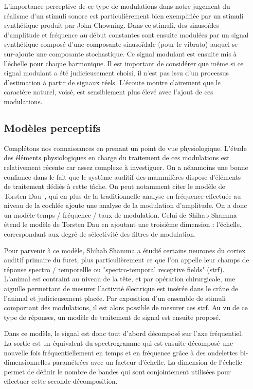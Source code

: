L'importance perceptive de ce type de modulations dans notre jugement du réalisme d'un stimuli sonore est particulièrement bien exemplifiée par un stimuli synthétique produit par John Chowning. Dans ce stimuli, des sinusoïdes d'amplitude et fréquence au début constantes sont ensuite modulées par un signal synthétique composé d'une composante sinusoïdale (pour le vibrato) auquel se sur-ajoute une composante stochastique. Ce signal modulant est ensuite mis à l'échelle pour chaque harmonique. Il est important de considérer que même si ce signal modulant a été judicieusement choisi, il n'est pas issu d'un processus d'estimation à partir de signaux réels. L'écoute montre clairement que le caractère naturel, voisé, est sensiblement plus élevé avec l'ajout de ces modulations.

\subsection{Modèles perceptifs}

Complétons nos connaissances en prenant un point de vue physiologique. L'étude des éléments physiologiques en charge du traitement de ces modulations est relativement récente car assez complexe à investiguer. On a néanmoins une bonne confiance dans le fait que le système auditif des mammifères dispose d'éléments de traitement dédiés à cette tâche. On peut notamment citer le modèle de Torsten Dau~\cite{dau1997modeling}, qui en plus de la traditionnelle analyse en fréquence effectuée au niveau de la cochlée ajoute une analyse de la modulation d'amplitude. On a donc un modèle temps / fréquence / taux de modulation. Celui de Shihab Shamma~\cite{fritz2003rapid} étend le modèle de Torsten Dau en ajoutant une troisième dimension : l'échelle, correspondant aux degré de sélectivité des filtres de modulation.

Pour parvenir à ce modèle, Shihab Shamma a étudié certains neurones du cortex auditif primaire du furet, plus particulièrement ce que l'on appelle leur champs de réponse spectro / temporellle ou "spectro-temporal receptive fields" (strf). L'animal est contraint au niveau de la tête, et par opération chirurgicale, une aiguille permettant de mesurer l'activité électrique est insérée dans le crâne de l'animal et judicieusement placée. Par exposition d'un ensemble de stimuli comportant des modulations, il est alors possible de mesurer ces strf. Au vu de ce type de réponses, un modèle de traitement de signal est ensuite proposé.

Dans ce modèle, le signal est donc tout d'abord décomposé sur l'axe fréquentiel. La sortie est un équivalent du spectrogramme qui est ensuite décomposé une nouvelle fois fréquentiellement en temps et en fréquence grâce à des ondelettes bi-dimensionnelles paramétrées avec un facteur d'échelle. La dimension de l'échelle permet de définir le nombre de bandes qui sont conjointement utilisées pour effectuer cette seconde décomposition.

